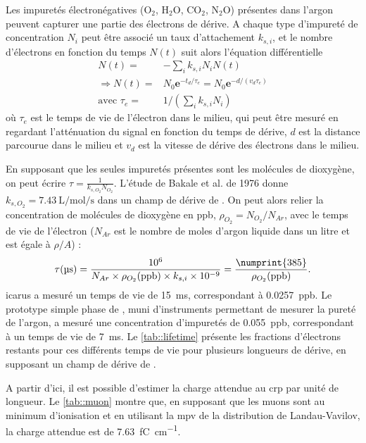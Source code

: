         Les impuretés électronégatives (O$_2$, H$_2$O, CO$_2$, N$_2$O) présentes dans l'argon peuvent capturer une partie des électrons de dérive. A chaque type d'impureté de concentration $N_i$ peut être associé un taux d'attachement $k_{s,i}$, et le nombre d'électrons en fonction du temps $N(t)$ suit alors l'équation différentielle\cite{Buckley1989}
        \begin{eqnarray}\label{eq::e_lifetime}
          N(t) = & -\sum_{i} k_{s,i}N_i N(t)\\
          \Rightarrow N(t) = & N_0\textbf{e}^{-t_d/\tau_e}=N_0\textbf{e}^{-d/(v_d\tau_e)}\label{eq::losses} \\
          \text{avec } \tau_e = & 1/(\sum_{i} k_{s,i}N_i)
        \end{eqnarray}
        où $\tau_e$ est le temps de vie de l'électron dans le milieu, qui peut être mesuré en regardant l'atténuation du signal en fonction du temps de dérive, $d$ est la distance parcourue dans le milieu et $v_d$ est la vitesse de dérive des électrons dans le milieu.

        En supposant que les seules impuretés présentes sont les molécules de dioxygène, on peut écrire $\tau = \frac{1}{k_{s,O_2} N_{O_2}}$. L'étude de Bakale et al. de 1976\cite{Bakale1976} donne $k_{s,O_2}=\SI{7.43}{\liter\per\mole\per\second}$ dans un champ de dérive de \driftfield{}. On peut alors relier la concentration de molécules de dioxygène en ppb, $\rho_{O_2}=N_{O_2}/N_{Ar}$, avec le temps de vie de l'électron ($N_{Ar}$ est le nombre de moles d'argon liquide dans un litre et est égale à $\rho/A$) : 
        \begin{equation}\label{eq::purity}
          \tau(\si{\micro\second}) = \frac{10^6}{N_{Ar}\times \rho_{O_2}(\si{ppb}) \times k_{s,i} \times 10^{-9}} = \frac{\numprint{385}}{\rho_{O_2}(\si{ppb})}.
        \end{equation}
        \gls{icarus} a mesuré un temps de vie de \SI{15}{\milli\second}\cite{Antonello2014}, correspondant à \SI{0.0257}{ppb}. Le prototype simple phase de \protosp{}, muni d'instruments permettant de mesurer la pureté de l'argon, a mesuré une concentration d'impuretés de \SI{0.055}{ppb}, correspondant à un temps de vie de \SI{7}{\milli\second}. Le \autoref{tab::lifetime} présente les fractions d'électrons restants pour ces différents temps de vie pour plusieurs longueurs de dérive, en supposant un champ de dérive de \driftfield{}.

        A partir d'ici, il est possible d'estimer la charge attendue au \gls{crp} par unité de longueur. Le \autoref{tab::muon} montre que, en supposant que les muons sont au minimum d'ionisation et en utilisant la \gls{mpv} de la distribution de Landau-Vavilov, la charge attendue est de \SI{7.63}{\femto\coulomb\per\centi\meter}.

